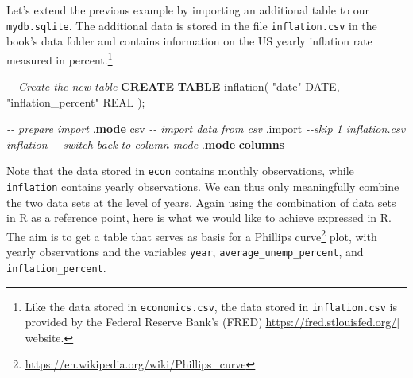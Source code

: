 \documentclass[
  12pt,
]{style/krantz}
\newenvironment{Shaded}{\begin{snugshade}}{\end{snugshade}}
\newcommand{\CommentTok}[1]{\textcolor[rgb]{0.56,0.35,0.01}{\textit{#1}}}
\newcommand{\DataTypeTok}[1]{\textcolor[rgb]{0.13,0.29,0.53}{#1}}
\newcommand{\KeywordTok}[1]{\textcolor[rgb]{0.13,0.29,0.53}{\textbf{#1}}}
\newcommand{\NormalTok}[1]{#1}
\newcommand{\OtherTok}[1]{\textcolor[rgb]{0.56,0.35,0.01}{#1}}
\renewcommand{\href}[2]{#2\footnote{\url{#1}}}
\begin{document}
Let's extend the previous example by importing an additional table to our \texttt{mydb.sqlite}. The additional data is stored in the file \texttt{inflation.csv} in the book's data folder and contains information on the US yearly inflation rate measured in percent.\footnote{Like the data stored in \texttt{economics.csv}, the data stored in \texttt{inflation.csv} is provided by the Federal Reserve Bank's (FRED){[}\url{https://fred.stlouisfed.org/}{]} website.}

\begin{Shaded}
\begin{Highlighting}[]
\CommentTok{{-}{-} Create the new table}
\KeywordTok{CREATE} \KeywordTok{TABLE}\NormalTok{ inflation(}
\OtherTok{"date"} \DataTypeTok{DATE}\NormalTok{,}
\OtherTok{"inflation\_percent"} \DataTypeTok{REAL}
\NormalTok{);}

\CommentTok{{-}{-} prepare import}
\NormalTok{.}\KeywordTok{mode}\NormalTok{ csv}
\CommentTok{{-}{-} import data from csv}
\NormalTok{.import }\CommentTok{{-}{-}skip 1 inflation.csv inflation}
\CommentTok{{-}{-} switch back to column mode }
\NormalTok{.}\KeywordTok{mode} \KeywordTok{columns}
\end{Highlighting}
\end{Shaded}

Note that the data stored in \texttt{econ} contains monthly observations, while \texttt{inflation} contains yearly observations. We can thus only meaningfully combine the two data sets at the level of years. Again using the combination of data sets in R as a reference point, here is what we would like to achieve expressed in R. The aim is to get a table that serves as basis for a \href{https://en.wikipedia.org/wiki/Phillips_curve}{Phillips curve} plot, with yearly observations and the variables \texttt{year}, \texttt{average\_unemp\_percent}, and \texttt{inflation\_percent}.
\end{document}
